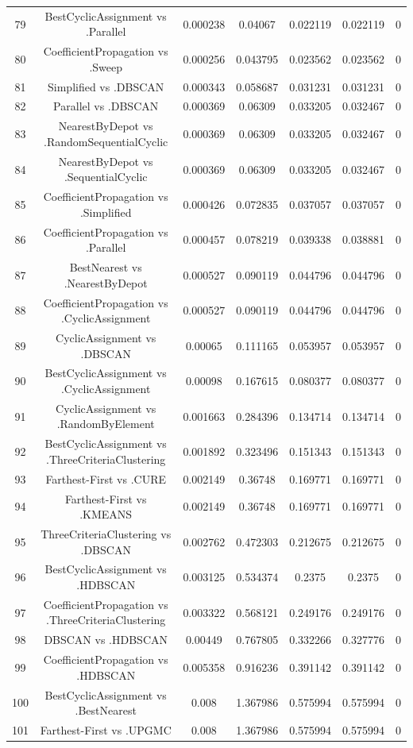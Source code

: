 \documentclass[a4paper,10pt]{article}
\begin{document}
\begin{landscape}
\begin{table}[!htp]
\begin{tabular}{ccccccc}
79&BestCyclicAssignment vs .Parallel&0.000238&0.04067&0.022119&0.022119&0\\
80&CoefficientPropagation vs .Sweep&0.000256&0.043795&0.023562&0.023562&0\\
81&Simplified vs .DBSCAN&0.000343&0.058687&0.031231&0.031231&0\\
82&Parallel vs .DBSCAN&0.000369&0.06309&0.033205&0.032467&0\\
83&NearestByDepot vs .RandomSequentialCyclic&0.000369&0.06309&0.033205&0.032467&0\\
84&NearestByDepot vs .SequentialCyclic&0.000369&0.06309&0.033205&0.032467&0\\
85&CoefficientPropagation vs .Simplified&0.000426&0.072835&0.037057&0.037057&0\\
86&CoefficientPropagation vs .Parallel&0.000457&0.078219&0.039338&0.038881&0\\
87&BestNearest vs .NearestByDepot&0.000527&0.090119&0.044796&0.044796&0\\
88&CoefficientPropagation vs .CyclicAssignment&0.000527&0.090119&0.044796&0.044796&0\\
89&CyclicAssignment vs .DBSCAN&0.00065&0.111165&0.053957&0.053957&0\\
90&BestCyclicAssignment vs .CyclicAssignment&0.00098&0.167615&0.080377&0.080377&0\\
91&CyclicAssignment vs .RandomByElement&0.001663&0.284396&0.134714&0.134714&0\\
92&BestCyclicAssignment vs .ThreeCriteriaClustering&0.001892&0.323496&0.151343&0.151343&0\\
93&Farthest-First vs .CURE&0.002149&0.36748&0.169771&0.169771&0\\
94&Farthest-First vs .KMEANS&0.002149&0.36748&0.169771&0.169771&0\\
95&ThreeCriteriaClustering vs .DBSCAN&0.002762&0.472303&0.212675&0.212675&0\\
96&BestCyclicAssignment vs .HDBSCAN&0.003125&0.534374&0.2375&0.2375&0\\
97&CoefficientPropagation vs .ThreeCriteriaClustering&0.003322&0.568121&0.249176&0.249176&0\\
98&DBSCAN vs .HDBSCAN&0.00449&0.767805&0.332266&0.327776&0\\
99&CoefficientPropagation vs .HDBSCAN&0.005358&0.916236&0.391142&0.391142&0\\
100&BestCyclicAssignment vs .BestNearest&0.008&1.367986&0.575994&0.575994&0\\
101&Farthest-First vs .UPGMC&0.008&1.367986&0.575994&0.575994&0\\

\end{tabular}
\end{table}
\end{landscape}
\end{document}
